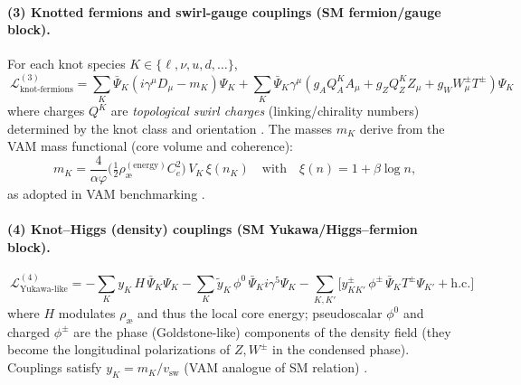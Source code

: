 \documentclass[11pt]{article}
\begin{document}
    \paragraph{(3) Knotted fermions and swirl-gauge couplings (SM fermion/gauge block).}
    For each knot species \(K\in\{\ell,\nu,u,d,\dots\}\),
    \[
        \boxed{\ \mathcal{L}^{(3)}_{\text{knot-fermions}}=
            \sum_{K}\bar{\Psi}_K\!\left(i\gamma^\mu D_\mu - m_K\right)\!\Psi_K
            +\sum_{K} \bar{\Psi}_K \gamma^\mu\left( g_A Q_A^K A_\mu + g_Z Q_Z^K Z_\mu + g_W W_\mu^\pm T^\pm\right)\Psi_K\ }
    \]
    where charges \(Q^K\) are \emph{topological swirl charges} (linking/chirality numbers) determined by the knot class and orientation \cite{Iskandarani2025TopLag,Iskandarani2025KnottedGauge}.
    The masses \(m_K\) derive from the VAM mass functional (core volume and coherence):
    \[
        m_K=\frac{4}{\alpha\varphi}\Big(\tfrac{1}{2}\rho_\text{\ae}^{(\text{energy})} C_e^2\Big)\, V_K \,\xi(n_K)
        \quad\text{with}\quad \xi(n)=1+\beta \log n,
    \]
    as adopted in VAM benchmarking \cite{Iskandarani2025Master,Iskandarani2025Benchmark}.

    \paragraph{(4) Knot–Higgs (density) couplings (SM Yukawa/Higgs–fermion block).}
    \[
        \boxed{\ \mathcal{L}^{(4)}_{\text{Yukawa-like}}=
            -\sum_{K} y_K\, H\, \bar{\Psi}_K \Psi_K
            -\sum_{K} \tilde{y}_K \,\phi^0\, \bar{\Psi}_K i\gamma^5 \Psi_K
            -\sum_{K,K'} \big[ y_{KK'}^\pm\, \phi^\pm\, \bar{\Psi}_K T^\pm \Psi_{K'} + \text{h.c.}\big]\ }
    \]
    where \(H\) modulates \(\rho_\text{\ae}\) and thus the local core energy; pseudoscalar \(\phi^0\) and charged \(\phi^\pm\) are the phase (Goldstone-like) components of the density field (they become the longitudinal polarizations of \(Z,W^\pm\) in the condensed phase).
    Couplings satisfy \(y_K = m_K/v_\text{sw}\) (VAM analogue of SM relation) \cite{Iskandarani2025Master,Iskandarani2025TopLag}.

\end{document}
